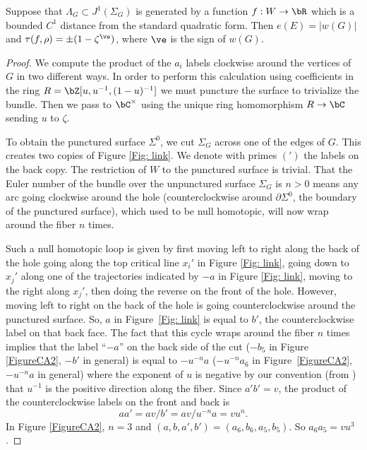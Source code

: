 \begin{theorem}\label{thm: punching hole}
Suppose that $\Lambda_G\subset J^1(\Sigma_G)$ is generated by a function $f:W\to \bR$ which is a bounded $C^1$ distance from the standard quadratic form. Then $e(E)= |w(G)|$ and $\tau(f,\rho)=\pm(1-\zeta^\ve)$, where $\ve$ is the sign of $w(G)$.
\end{theorem}

\begin{proof} We compute the product of the $a_i$ labels clockwise around the vertices of~$G$ in two different ways. In order to perform this calculation using coefficients in the ring $R=\bZ[u,u^{-1},(1-u)^{-1}]$ we must puncture the surface to trivialize the bundle. Then we pass to $\bC^\times$ using the unique ring homomorphism $R\to \bC$ sending $u$ to $\zeta$.

To obtain the punctured surface $\Sigma^0$, we cut $\Sigma_G$ across one of the edges of $G$. This creates two copies of Figure \ref{Fig: link}. We denote with primes $(')$ the labels on the back copy. The restriction of $W$ to the punctured surface is trivial. That the Euler number of the bundle over the unpunctured surface $\Sigma_G$ is $n>0$ means any arc going clockwise around the hole (counterclockwise around $\partial\Sigma^0$, the boundary of the punctured surface), which used to be null homotopic, will now wrap around the fiber $n$ times.

Such a null homotopic loop is given by first moving left to right along the back of the hole going along the top critical line $x_i'$ in Figure \ref{Fig: link}, going down to $x_j'$ along one of the trajectories indicated by $-a$ in Figure \ref{Fig: link}, moving to the right along $x_j'$, then doing the reverse on the front of the hole. However, moving left to right on the back of the hole is going counterclockwise around the punctured surface. So, $a$ in Figure~\ref{Fig: link} is equal to $b'$, the counterclockwise label on that back face. The fact that this cycle wraps around the fiber $n$ times implies that the label ``$-a$'' on the back side of the cut ($-b_5$ in Figure \ref{FigureCA2}, $-b'$ in general) is equal to $-u^{-n}a$ ($-u^{-n}a_6$ in Figure~\ref{FigureCA2}, $-u^{-n}a$ in general) where the exponent of $u$ is negative by our convention (from \cite{IK93}) that $u^{-1}$ is the positive direction along the fiber. Since $a'b'=v$, the product of the counterclockwise labels on the front and back is
\[
aa'=av/b'=av/u^{-n}a=vu^n.
\]
In Figure \ref{FigureCA2}, $n=3$ and $(a,b,a',b')=(a_6,b_6,a_5,b_5)$. So $a_6a_5=vu^3$.


\end{proof}
